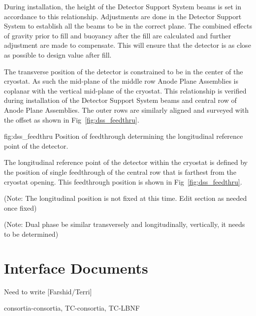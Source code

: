 During installation, the height of the Detector Support System beams
is set in accordance to this relationship. Adjustments are done in the
Detector Support System to establish all the beams to be in the
correct plane. The combined effects of gravity prior to fill and
buoyancy after the fill are calculated and further adjustment are made
to compensate. This will ensure that the detector is as close as
possible to design value after fill.

The transverse position of the detector is constrained to be in the
center of the cryostat. As such the mid-plane of the middle row Anode
Plane Assemblies is coplanar with the vertical mid-plane of the
cryostat. This relationship is verified during installation of the
Detector Support System beams and central row of Anode Plane
Assemblies. The outer rows are similarly aligned and surveyed with the
offset as shown in Fig~\ref{fig:dss_feedthru}.
\begin{dunefigure}{fig:dss_feedthru}
  {Position of feedthrough determining the longitudinal reference point of the detector.}
\end{dunefigure}


The longitudinal reference point of the detector within the cryostat
is defined by the position of single feedthrough of the central row
that is farthest from the cryostat opening. This feedthrough position
is shown in Fig~\ref{fig:dss_feedthru}.

(Note: The longitudinal position is not fixed at this time. Edit
section as needed once fixed)

(Note: Dual phase be similar
transversely and longitudinally, vertically, it needs to be
determined)


\section{Interface Documents}
\label{sec:fdsp-coord-integ-interface}
Need to write [Farshid/Terri]

consortia-consortia, TC-consortia, TC-LBNF



